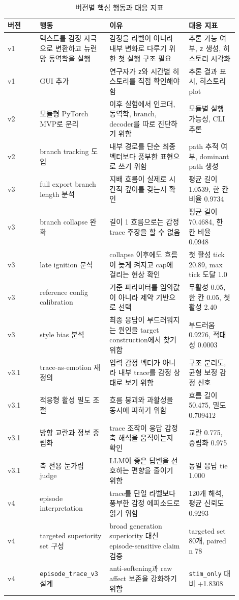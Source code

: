 \documentclass[11pt,a4paper]{article}
\newcommand{\eng}[1]{\texttt{#1}}
\begin{document}
\begin{longtable}{p{0.13\linewidth}p{0.25\linewidth}p{0.32\linewidth}p{0.20\linewidth}}
\caption{버전별 핵심 행동과 대응 지표}\\
\toprule
버전 & 행동 & 이유 & 대응 지표 \\
\midrule
v1 & 텍스트를 감정 자극으로 변환하고 뉴런망 동역학을 실행 & 감정을 라벨이 아니라 내부 변화로 다루기 위한 첫 실행 구조 필요 & 추론 가능 여부, \eng{z} 생성, 히스토리 시각화 \\
v1 & GUI 추가 & 연구자가 \eng{z}와 시간별 히스토리를 직접 확인해야 함 & 추론 결과 표시, 히스토리 plot \\
v2 & 모듈형 PyTorch MVP로 분리 & 이후 실험에서 인코더, 동역학, branch, decoder를 따로 진단하기 위함 & 모듈별 실행 가능성, CLI 추론 \\
v2 & branch tracking 도입 & 내부 경로를 단순 최종 벡터보다 풍부한 표현으로 쓰기 위함 & path 추적 여부, dominant path 생성 \\
v3 & full export branch length 분석 & 지배 흐름이 실제로 시간적 깊이를 갖는지 확인 & 평균 길이 1.0539, 한 칸 비율 0.9734 \\
v3 & branch collapse 완화 & 길이 1 흐름으로는 감정 trace 주장을 할 수 없음 & 평균 길이 70.4684, 한 칸 비율 0.0948 \\
v3 & late ignition 분석 & collapse 이후에도 흐름이 늦게 켜지고 cap에 걸리는 현상 확인 & 첫 활성 tick 20.89, max tick 도달 1.0 \\
v3 & reference config calibration & 기준 파라미터를 임의값이 아니라 제약 기반으로 선택 & 무활성 0.05, 한 칸 0.05, 첫 활성 2.40 \\
v3 & style bias 분석 & 최종 응답이 부드러워지는 원인을 target construction에서 찾기 위함 & 부드러움 0.9276, 적대성 0.0003 \\
v3.1 & trace-as-emotion 재정의 & 입력 감정 벡터가 아니라 내부 trace를 감정 상태로 보기 위함 & 구조 분리도, 균형 보정 감정 신호 \\
v3.1 & 적응형 활성 밀도 조절 & 흐름 붕괴와 과활성을 동시에 피하기 위함 & 흐름 길이 50.475, 밀도 0.709412 \\
v3.1 & 방향 교란과 정보 중립화 & trace 조작이 응답 감정축 해석을 움직이는지 확인 & 교란 0.775, 중립화 0.975 \\
v3.1 & 축 전용 눈가림 judge & LLM이 좋은 답변을 선호하는 편향을 줄이기 위함 & 동일 응답 tie 1.000 \\
v4 & episode interpretation & trace를 단일 라벨보다 풍부한 감정 에피소드로 읽기 위함 & 120개 해석, 평균 신뢰도 0.9293 \\
v4 & targeted superiority set 구성 & broad generation superiority 대신 episode-sensitive claim 검증 & targeted set 80개, paired n 78 \\
v4 & \eng{episode\_trace\_v3} 설계 & anti-softening과 raw affect 보존을 강화하기 위함 & \eng{stim\_only} 대비 +1.8308 \\
\bottomrule
\end{longtable}
\end{document}
